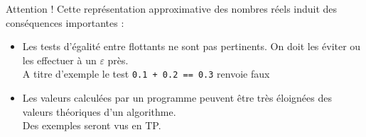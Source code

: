 \documentclass[10pt]{beamer}
\begin{document}
\begin{frame}{\Ctitle}{\stitle}
    \begin{alertblock}{\textcolor{yellow}{\important} Attention !}
        Cette représentation approximative des nombres réels induit des conséquences importantes :
        \begin{itemize}
            \item<2-> Les tests d'égalité entre flottants ne sont pas pertinents. On doit les éviter ou les effectuer à un $\varepsilon$ près. \\
             A titre d'exemple le test {\tt 0.1 + 0.2 == 0.3} renvoie faux 
            \item<4-> Les valeurs calculées par un programme peuvent être très éloignées des valeurs théoriques d'un algorithme.\\
             Des exemples seront vus en TP.
        \end{itemize}
    \end{alertblock}
\end{frame}
\end{document}
